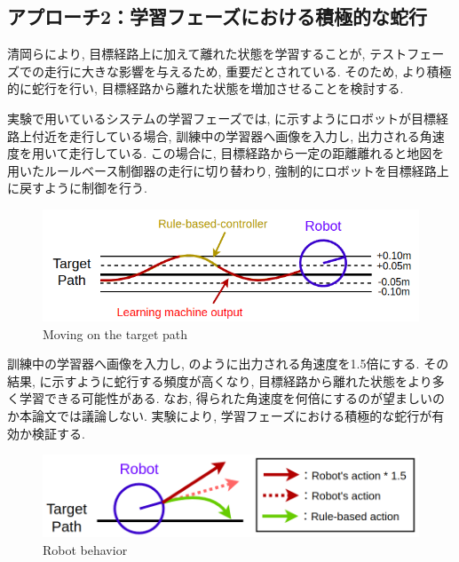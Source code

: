 \newpage

\subsection{アプローチ2：学習フェーズにおける積極的な蛇行}
清岡ら\cite{kiyooka}により, 目標経路上に加えて離れた状態を学習することが, テストフェーズでの走行に大きな影響を与えるため, 重要だとされている. そのため, より積極的に蛇行を行い, 目標経路から離れた状態を増加させることを検討する. \par
実験で用いているシステムの学習フェーズでは,  に示すようにロボットが目標経路上付近を走行している場合, 訓練中の学習器へ画像を入力し, 出力される角速度を用いて走行している. この場合に, 目標経路から一定の距離離れると地図を用いたルールベース制御器の走行に切り替わり, 強制的にロボットを目標経路上に戻すように制御を行う. 

\begin{figure}[hbtp]
  \centering
 \includegraphics[keepaspectratio, scale=0.58]
      {images/act1.0.png}
 \caption{Moving on the target path}
 \label{Fig:act1.0}
\end{figure}

訓練中の学習器へ画像を入力し, のように出力される角速度を1.5倍にする. その結果, に示すように蛇行する頻度が高くなり, 目標経路から離れた状態をより多く学習できる可能性がある. なお, 得られた角速度を何倍にするのが望ましいのか本論文では議論しない. 実験により, 学習フェーズにおける積極的な蛇行が有効か検証する.

\begin{figure}[hbtp]
  \centering
 \includegraphics[keepaspectratio, scale=0.43]
      {images/3action.png}
 \caption{Robot behavior}
 \label{Fig:3action}
\end{figure}

